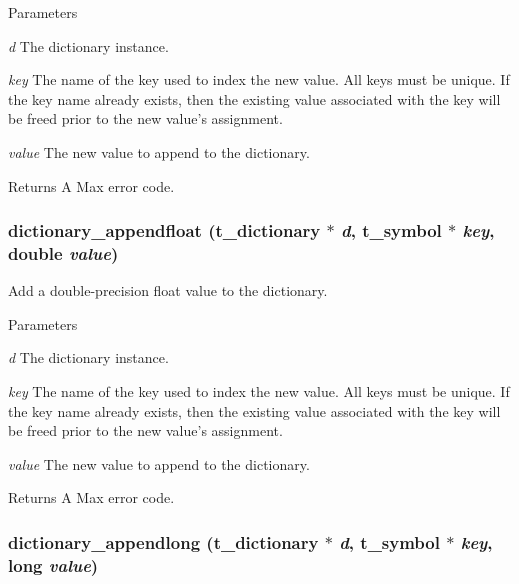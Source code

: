 \begin{DoxyParams}{Parameters}
\item[{\em d}]The dictionary instance. \item[{\em key}]The name of the key used to index the new value. All keys must be unique. If the key name already exists, then the existing value associated with the key will be freed prior to the new value's assignment. \item[{\em value}]The new value to append to the dictionary. \end{DoxyParams}
\begin{DoxyReturn}{Returns}
A Max error code. 
\end{DoxyReturn}
\hypertarget{group__dictionary_ga4250c0f1a0c83b1585012ea65f172e13}{
\subsubsection[{dictionary\_\-appendfloat}]{ dictionary\_\-appendfloat ({\bf t\_\-dictionary} $\ast$ {\em d}, \/  {\bf t\_\-symbol} $\ast$ {\em key}, \/  double {\em value})}}
\label{group__dictionary_ga4250c0f1a0c83b1585012ea65f172e13}


Add a double-\/precision float value to the dictionary. 
\begin{DoxyParams}{Parameters}
\item[{\em d}]The dictionary instance. \item[{\em key}]The name of the key used to index the new value. All keys must be unique. If the key name already exists, then the existing value associated with the key will be freed prior to the new value's assignment. \item[{\em value}]The new value to append to the dictionary. \end{DoxyParams}
\begin{DoxyReturn}{Returns}
A Max error code. 
\end{DoxyReturn}
\hypertarget{group__dictionary_gaf401b30bed5b47e5defd1421e7f14cce}{
\subsubsection[{dictionary\_\-appendlong}]{ dictionary\_\-appendlong ({\bf t\_\-dictionary} $\ast$ {\em d}, \/  {\bf t\_\-symbol} $\ast$ {\em key}, \/  long {\em value})}}
\label{group__dictionary_gaf401b30bed5b47e5defd1421e7f14cce}


